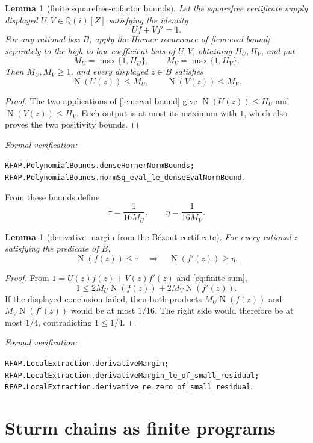 \documentclass[11pt]{article}
\newtheorem{lemma}[theorem]{Lemma}
\newcommand{\Qi}{\mathbb{Q}(i)}
\newcommand{\Norm}[1]{\operatorname{N}\!\left(#1\right)}
\newcommand{\leanref}[1]{\par\smallskip\noindent
  \emph{Formal verification:}\par\nobreak
  {\raggedright\nolinkurl{#1}.\par}}
\begin{document}
\begin{lemma}[finite squarefree-cofactor bounds]
\label{lem:squarefree-cofactor-bounds}
Let the squarefree certificate supply displayed $U,V\in\Qi[Z]$ satisfying
the identity
\[
                         Uf+Vf'=1.
\]
For any rational box $B$, apply the Horner recurrence of
\cref{lem:eval-bound} separately to the high-to-low coefficient lists of
$U,V$, obtaining $H_U,H_V$, and put
\[
                       M_U=\max\{1,H_U\},
                       \qquad
                       M_V=\max\{1,H_V\}.
\]
Then $M_U,M_V\ge1$, and every displayed $z\in B$ satisfies
\[
                  \Norm{U(z)}\le M_U,
                  \qquad
                  \Norm{V(z)}\le M_V.
\]
\end{lemma}

\begin{proof}
The two applications of \cref{lem:eval-bound} give
$\Norm{U(z)}\le H_U$ and $\Norm{V(z)}\le H_V$.  Each output is at most its
maximum with $1$, which also proves the two positivity bounds.
\end{proof}

\leanref{RFAP.PolynomialBounds.denseHornerNormBounds;
RFAP.PolynomialBounds.normSq_eval_le_denseEvalNormBound}

From these bounds define
\begin{equation}
\label{eq:bez-margins}
       \tau=\frac{1}{16M_U},\qquad \eta=\frac{1}{16M_V}.
\end{equation}

\begin{lemma}[derivative margin from the Bézout certificate]
\label{lem:derivative-margin}
For every rational $z$ satisfying the predicate of $B$,
\[
  \Norm{f(z)}\le\tau \quad\Longrightarrow\quad \Norm{f'(z)}\ge\eta.
\]
\end{lemma}

\begin{proof}
From $1=U(z)f(z)+V(z)f'(z)$ and \eqref{eq:finite-sum},
\[
  1\le 2M_U\Norm{f(z)}+2M_V\Norm{f'(z)}.
\]
If the displayed conclusion failed, then both products
$M_U\Norm{f(z)}$ and $M_V\Norm{f'(z)}$ would be at most $1/16$.
The right side would therefore be at most $1/4$, contradicting $1\le1/4$.
\end{proof}

\leanref{RFAP.LocalExtraction.derivativeMargin;
RFAP.LocalExtraction.derivativeMargin_le_of_small_residual;
RFAP.LocalExtraction.derivative_ne_zero_of_small_residual}

\section{Sturm chains as finite programs}
\end{document}
